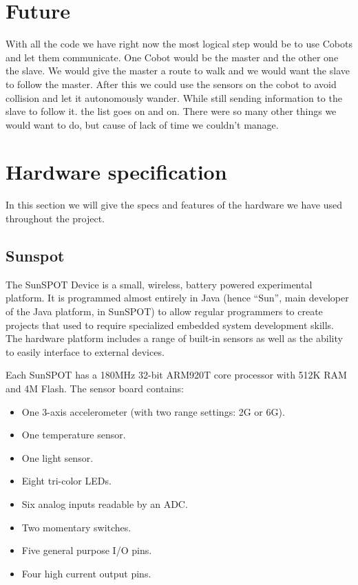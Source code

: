 \documentclass[a4paper,12pt]{article}
\begin{document}
\section{Future}
\label{sec:future}

With all the code we have right now the most logical step would be to use Cobots
and let them communicate. One Cobot would be the master and the other one the
slave. We would give the master a route to walk and we would want the slave to
follow the master. After this we could use the sensors on the cobot to avoid
collision and let it autonomously wander. While still sending information to the
slave to follow it. the list goes on and on. There were so many other things we
would want to do, but cause of lack of time we couldn't manage.

\appendix

\section{Hardware specification}
\label{app:hardware}

In this section we will give the specs and features of the hardware we have used
throughout the project.

\subsection{Sunspot}
\label{app:sunspot}

The SunSPOT Device is a small, wireless, battery powered experimental platform.
It is programmed almost entirely in Java (hence ``Sun'', main developer of the
Java platform, in SunSPOT) to allow regular programmers to create projects that
used to require specialized embedded system development skills. The hardware
platform includes a range of built-in sensors as well as the ability to easily
interface to external devices.

Each SunSPOT has a 180MHz 32-bit ARM920T core processor with 512K RAM and 4M
Flash. The sensor board contains:

\begin{itemize}
    \item One 3-axis accelerometer (with two range settings: 2G or 6G).
    \item One temperature sensor.
    \item One light sensor.
    \item Eight tri-color LEDs.
    \item Six analog inputs readable by an ADC.
    \item Two momentary switches.
    \item Five general purpose I/O pins.
    \item Four high current output pins.
\end{itemize}
\end{document}
